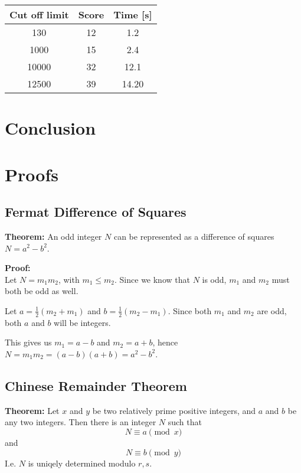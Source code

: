 \documentclass[a4paper, 12pt]{report}
\begin{document}
\begin{tabular} {c c c}
Cut off limit 	&	 Score 	& Time [s] \\ \hline
130		&	12		& 1.2 \\
1000	&	15		& 2.4 \\
10000 	& 	32		& 12.1 \\
12500	&	39		&14.20 \\

\end{tabular}
\chapter{Conclusion}
\appendix
\chapter{Proofs}
\section{Fermat Difference of Squares}
\label{sec:fermatproof}
\begin{description}
\item{\bf Theorem:} An odd integer $N$ can be represented as a difference of squares $N = a^2 - b^2$.


\item{\bf Proof:} \\
Let $ N = m_1m_2 $, with $ m_1 \le m_2 $. Since we know that $N$ is odd, $m_1$ and $m_2$ must both be odd as well.

Let $ a = \frac{1}{2} (m_2 + m_1) $ and $ b = \frac{1}{2} (m_2 - m_1) $. Since both $m_1$ and $m_2$ are odd, both $a$ and $b$ will be integers. 

This gives us $m_1 = a - b$ and $m_2 = a + b $, hence $N = m_1m_2 = (a - b)(a + b) = a^2 - b^2$.

\end{description}

\section{Chinese Remainder Theorem}
\label{sec:chinese}

\begin{description}
\item{\bf Theorem:} Let $x$ and $y$ be two relatively prime positive integers, and $a$ and $b$ be any two integers. Then there is an integer $N$ such that 
\begin{equation}
N \equiv a \pmod x 
\end{equation}
and
\begin{equation}
N \equiv b \pmod y
\end{equation}
I.e. $N$ is uniqely determined modulo $r,s$.

\end{description}
\end{document}
